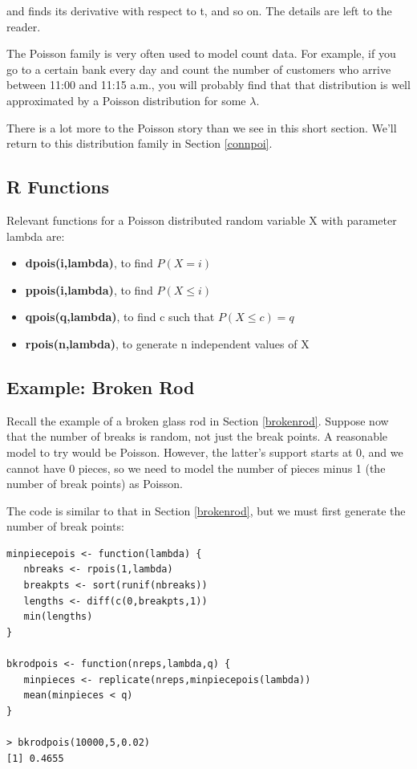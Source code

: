and finds its derivative with respect to t, and so on.  The details are
left to the reader.

\label{bankex}
The Poisson family is very often used to model count data.  For example,
if you go to a certain bank every day and count the number of customers
who arrive between 11:00 and 11:15 a.m., you will probably find that that
distribution is well approximated by a Poisson distribution for some
$\lambda$.

There is a lot more to the Poisson story than we see in this short
section.  We'll return to this distribution family in Section
\ref{connpoi}. 

\subsection{R Functions}

Relevant functions for a Poisson distributed random variable X
with parameter lambda are:

\begin{itemize}

\item {\bf dpois(i,lambda)}, to find $P(X = i)$

\item {\bf ppois(i,lambda)}, to find $P(X \leq i)$

\item {\bf qpois(q,lambda)}, to find c such that $P(X \leq c) = q$

\item {\bf rpois(n,lambda)}, to generate n independent values of X

\end{itemize}

\subsection{Example: Broken Rod}

Recall the example of a broken glass rod in Section \ref{brokenrod}.
Suppose now that the number of breaks is random, not just the break
points.  A reasonable model to try would be Poisson.  However, 
the latter's support starts at 0, and we cannot have 0 pieces,
so we need to model the number of pieces minus 1 (the number of break
points) as Poisson.

The code is similar to that in Section \ref{brokenrod}, but we must
first generate the number of break points:

\begin{lstlisting}
minpiecepois <- function(lambda) {
   nbreaks <- rpois(1,lambda)
   breakpts <- sort(runif(nbreaks))
   lengths <- diff(c(0,breakpts,1))
   min(lengths)
}

bkrodpois <- function(nreps,lambda,q) {
   minpieces <- replicate(nreps,minpiecepois(lambda))
   mean(minpieces < q) 
}

> bkrodpois(10000,5,0.02)  
[1] 0.4655
\end{lstlisting}

